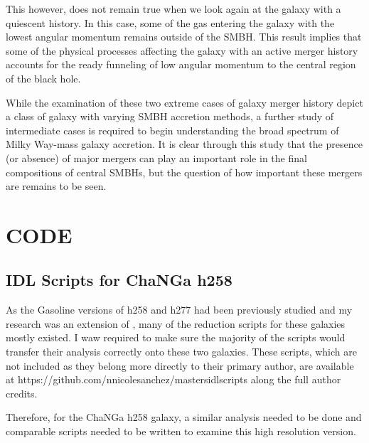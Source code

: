 \documentclass[12pt,headA,chapB]{fiskthesis}
\begin{document}
This however, does not remain true when we look again at the galaxy with a quiescent history. In this case, some of the gas entering the galaxy with the lowest angular momentum remains outside of the SMBH. This result implies that some of the physical processes affecting the galaxy with an active merger history accounts for the ready funneling of low angular momentum to the central region of the black hole. 

While the examination of these two extreme cases of galaxy merger history depict a class of galaxy with varying SMBH accretion methods, a further study of intermediate cases is required to begin understanding the broad spectrum of Milky Way-mass galaxy accretion. It is clear through this study that the presence (or absence) of major mergers can play an important role in the final compositions of central SMBHs, but the question of how important these mergers are remains to be seen.



\backmatter
\chapter{CODE}
\section{IDL Scripts for ChaNGa h258}
As the Gasoline versions of h258 and h277 had been previously studied and my research was an extension of \cite{Bellovary2013}, many of the reduction scripts for these galaxies mostly existed. I waw required to make sure the majority of the scripts would transfer their analysis correctly onto these two galaxies. These scripts, which are not included as they belong more directly to their primary author, are available at https://github.com/nnicolesanchez/mastersidlscripts along the full author credits.

Therefore, for the ChaNGa h258 galaxy, a similar analysis needed to be done and comparable scripts needed to be written to examine this high resolution version.
\end{document}

